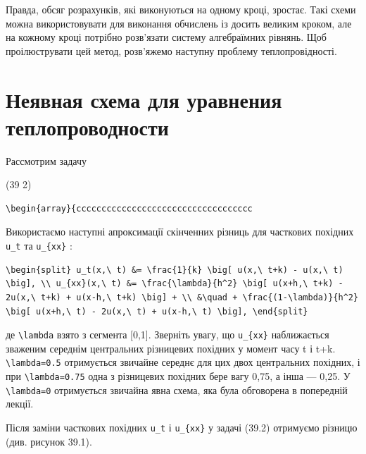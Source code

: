 \documentclass[
  ukrainian,
]{article}
\begin{document}
Правда, обсяг розрахунків, які виконуються на одному кроці, зростає.
Такі схеми можна використовувати для виконання обчислень із досить
великим кроком, але на кожному кроці потрібно розв'язати систему
алгебраїмних рівнянь. Щоб проілюструвати цей метод, розв'яжемо наступну
проблему теплопровідності.

\section{Неявная схема для уравнения
теплопроводности}\label{ux43dux435ux44fux432ux43dux430ux44f-ux441ux445ux435ux43cux430-ux434ux43bux44f-ux443ux440ux430ux432ux43dux435ux43dux438ux44f-ux442ux435ux43fux43bux43eux43fux440ux43eux432ux43eux434ux43dux43eux441ux442ux438}

Рассмотрим задачу

(39 2)

\begin{verbatim}
\begin{array}{ccccccccccccccccccccccccccccccccccc
\end{verbatim}

Використаємо наступні апроксимації скінченних різниць для часткових
похідних \texttt{u\_t} та \texttt{u\_\{xx\}} :

\begin{verbatim}
\begin{split} u_t(x,\ t) &= \frac{1}{k} \big[ u(x,\ t+k) - u(x,\ t) \big], \\ u_{xx}(x,\ t) &= \frac{\lambda}{h^2} \big[ u(x+h,\ t+k) - 2u(x,\ t+k) + u(x-h,\ t+k) \big] + \\ &\quad + \frac{(1-\lambda)}{h^2} \big[ u(x+h,\ t) - 2u(x,\ t) + u(x-h,\ t) \big], \end{split}
\end{verbatim}

де \texttt{\textbackslash{}lambda} взято з сегмента {[}0,1{]}. Зверніть
увагу, що \texttt{u\_\{xx\}} наближається зваженим середнім центральних
різницевих похідних у момент часу t і t+k.
\texttt{\textbackslash{}lambda=0.5} отримується звичайне середнє для цих
двох центральних похідних, і при \texttt{\textbackslash{}lambda=0.75}
одна з різницевих похідних бере вагу 0,75, а інша --- 0,25. У
\texttt{\textbackslash{}lambda=0} отримується звичайна явна схема, яка
була обговорена в попередній лекції.

Після заміни часткових похідних \texttt{u\_t} і \texttt{u\_\{xx\}} у
задачі (39.2) отримуємо різницю (див. рисунок 39.1).
\end{document}
